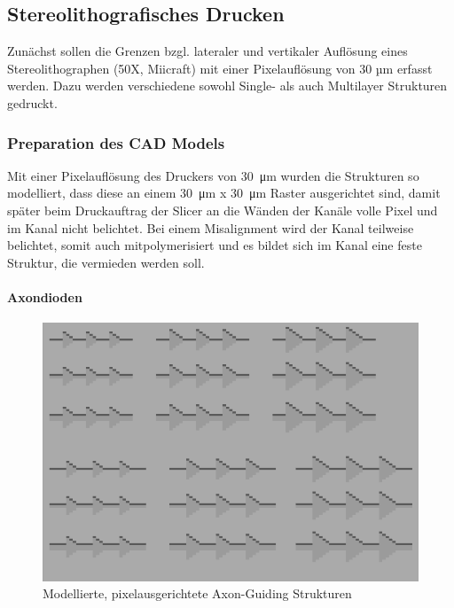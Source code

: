 
\subsection{Stereolithografisches Drucken}

Zunächst sollen die Grenzen bzgl. lateraler und vertikaler Auflösung eines Stereolithographen (50X, Miicraft) mit einer Pixelauflösung von 30 µm erfasst werden. Dazu werden verschiedene sowohl Single- als auch Multilayer Strukturen gedruckt.

\subsubsection{Preparation des CAD Models}

Mit einer Pixelauflösung des Druckers von \SI{30}{\micro\meter} wurden die Strukturen so modelliert, dass diese an einem \SI{30}{\micro\meter} x \SI{30}{\micro\meter} Raster ausgerichtet sind, damit später beim Druckauftrag der Slicer an die Wänden der Kanäle volle Pixel und im Kanal nicht belichtet. Bei einem Misalignment wird der Kanal teilweise belichtet, somit auch mitpolymerisiert und es bildet sich im Kanal eine feste Struktur, die vermieden werden soll.

\paragraph{Axondioden\\}


\begin{figure}
\vspace{5pt}
\centering
\includegraphics[width=\linewidth]{img/AxonDiode.png}
\caption{Modellierte, pixelausgerichtete Axon-Guiding Strukturen}
\label{fig:AxonDiode}
\end{figure}

